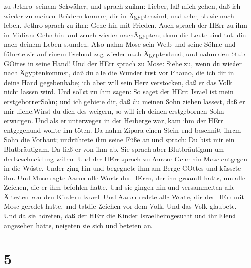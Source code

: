 zu Jethro, seinem Schwäher, und sprach zuihm: Lieber, laß mich gehen,
daß ich wieder zu meinen Brüdern komme, die in Ägyptensind, und sehe, ob
sie noch leben. Jethro sprach zu ihm: Gehe hin mit Frieden.
 Auch sprach der HErr zu ihm in Midian: Gehe hin und zeuch
wieder nachÄgypten; denn die Leute sind tot, die nach deinem Leben
stunden.  Also nahm Mose sein Weib und seine Söhne und
führete sie auf einem Eselund zog wieder nach Ägyptenland; und nahm den
Stab GOttes in seine Hand!  Und der HErr sprach zu Mose:
Siehe zu, wenn du wieder nach Ägyptenkommst, daß du alle die Wunder tust
vor Pharao, die ich dir in deine Hand gegebenhabe; ich aber will sein
Herz verstocken, daß er das Volk nicht lassen wird.  Und
sollst zu ihm sagen: So saget der HErr: Israel ist mein
erstgebornerSohn;  und ich gebiete dir, daß du meinen Sohn
ziehen lassest, daß er mir diene.Wirst du dich des weigern, so will ich
deinen erstgebornen Sohn erwürgen.  Und als er unterwegen
in der Herberge war, kam ihm der HErr entgegenund wollte ihn töten.
 Da nahm Zipora einen Stein und beschnitt ihrem Sohn die
Vorhaut; undrührete ihm seine Füße an und sprach: Du bist mir ein
Blutbräutigam.  Da ließ er von ihm ab. Sie sprach aber
Blutbräutigam um derBeschneidung willen.  Und der HErr
sprach zu Aaron: Gehe hin Mose entgegen in die Wüste. Under ging hin und
begegnete ihm am Berge GOttes und küssete ihn.  Und Mose
sagte Aaron alle Worte des HErrn, der ihn gesandt hatte, undalle
Zeichen, die er ihm befohlen hatte.  Und sie gingen hin und
versammelten alle Ältesten von den Kindern Israel.  Und
Aaron redete alle Worte, die der HErr mit Mose geredet hatte, und tatdie
Zeichen vor dem Volk.  Und das Volk glaubete. Und da sie
höreten, daß der HErr die Kinder Israelheimgesucht und ihr Elend
angesehen hätte, neigeten sie sich und beteten an.

\hypertarget{section-4}{%
\section{5}\label{section-4}}

